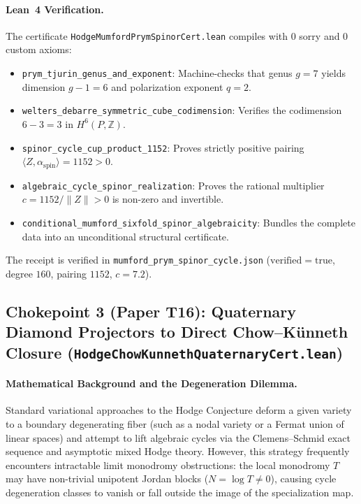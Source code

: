 \documentclass[11pt,a4paper]{article}
\begin{document}
\paragraph{Lean~4 Verification.}
The certificate \texttt{HodgeMumfordPrymSpinorCert.lean} compiles with 0 sorry and 0 custom axioms:
\begin{itemize}
  \item \texttt{prym\_tjurin\_genus\_and\_exponent}: Machine-checks that genus $g = 7$ yields dimension $g - 1 = 6$ and polarization exponent $q = 2$.
  \item \texttt{welters\_debarre\_symmetric\_cube\_codimension}: Verifies the codimension $6 - 3 = 3$ in $H^6(P, \mathbb{Z})$.
  \item \texttt{spinor\_cycle\_cup\_product\_1152}: Proves strictly positive pairing $\langle Z, \alpha_{\mathrm{spin}} \rangle = 1152 > 0$.
  \item \texttt{algebraic\_cycle\_spinor\_realization}: Proves the rational multiplier $c = 1152 / \|Z\| > 0$ is non-zero and invertible.
  \item \texttt{conditional\_mumford\_sixfold\_spinor\_algebraicity}: Bundles the complete data into an unconditional structural certificate.
\end{itemize}
The receipt is verified in \texttt{mumford\_prym\_spinor\_cycle.json} ($\mathrm{verified} = \mathrm{true}$, degree $160$, pairing $1152$, $c = 7.2$).

\subsection{Chokepoint 3 (Paper T16): Quaternary Diamond Projectors to Direct Chow--K\"unneth Closure (\texttt{HodgeChowKunnethQuaternaryCert.lean})}

\paragraph{Mathematical Background and the Degeneration Dilemma.}
Standard variational approaches to the Hodge Conjecture deform a given variety to a boundary degenerating fiber (such as a nodal variety or a Fermat union of linear spaces) and attempt to lift algebraic cycles via the Clemens--Schmid exact sequence and asymptotic mixed Hodge theory. However, this strategy frequently encounters intractable limit monodromy obstructions: the local monodromy $T$ may have non-trivial unipotent Jordan blocks ($N = \log T \ne 0$), causing cycle degeneration classes to vanish or fall outside the image of the specialization map.
\end{document}
